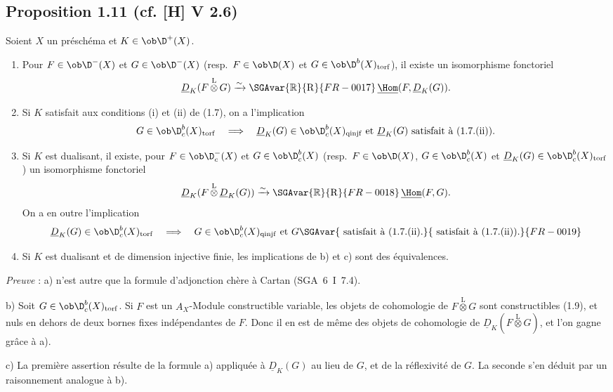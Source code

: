 \subsection*{Proposition 1.11 (cf. [H] V 2.6)}
Soient $X$ un préschéma et $K \in \ob \D^{+}(X)$.
\begin{enumerate}
\item[a)] Pour $F \in \ob \D^{-}(X)$ et $G \in \ob \D^{-}(X)$ (resp.~$F \in \ob \D(X)$ et $G \in \ob \D^{b}(X)_{\mathrm{torf}}$), il existe un isomorphisme fonctoriel
\[
\underline{D}_K(F \mathop{\otimes}\limits^{\mathrm{L}} G) \xrightarrow{\sim} \SGAvar{\mathbb{R}}{\mathrm{R}}{FR-0017}\,\underline{\Hom}(F, \underline{D}_K(G)).
\]
\item[b)] Si $K$
satisfait aux conditions (i) et (ii) de (1.7), on a l'implication
\[
G \in \ob \D_c^{b}(X)_{\mathrm{torf}} \quad \Longrightarrow \quad \underline{D}_K(G) \in \ob \D_c^{b}(X)_{\mathrm{qinjf}} \text{ et } \underline{D}_K(G) \text{ satisfait à (1.7.(ii)).}
\]
\item[c)] Si $K$ est dualisant, il existe, pour $F \in \ob \D_c^{-}(X)$ et $G \in \ob \D_c^{b}(X)$ (resp.~$F \in \ob \D(X)$, $G \in \ob \D_c^{b}(X)$ et $\underline{D}_K(G) \in \ob \D_c^{b}(X)_{\mathrm{torf}}$) un isomorphisme fonctoriel
\[
\underline{D}_K(F \mathop{\otimes}\limits^{\mathrm{L}} \underline{D}_K(G)) \xrightarrow{\sim} \SGAvar{\mathbb{R}}{\mathrm{R}}{FR-0018}\,\underline{\Hom}(F, G).
\]
On a en outre l'implication
\[
\underline{D}_K(G) \in \ob \D_c^{b}(X)_{\mathrm{torf}} \quad \Longrightarrow \quad G \in \ob \D_c^{b}(X)_{\mathrm{qinjf}} \text{ et } G \SGAvar{\text{ satisfait à (1.7.(ii).}}{\text{ satisfait à (1.7.(ii)).}}{FR-0019}
\]
\item[d)] Si $K$ est dualisant et de dimension injective finie, les implications de b) et c) sont des équivalences.
\end{enumerate}

\emph{Preuve} : a) n'est autre que la formule d'adjonction chère à Cartan (SGA~6~I~7.4).

b) Soit $G \in \ob \D_c^{b}(X)_{\mathrm{torf}}$. Si $F$ est un $A_X$-Module constructible variable, les objets de cohomologie de $F \mathop{\otimes}\limits^{\mathrm{L}} G$ sont constructibles (1.9), et nuls en dehors de deux bornes fixes indépendantes de $F$. Donc il en est de même des objets de cohomologie de $\underline{D}_K(F \mathop{\otimes}\limits^{\mathrm{L}} G)$, et l'on gagne grâce à a).

c) La première assertion résulte de la formule a) appliquée à $\underline{D}_K(G)$ au lieu de $G$, et de la réflexivité de $G$. La seconde s'en déduit par un raisonnement analogue à b).

